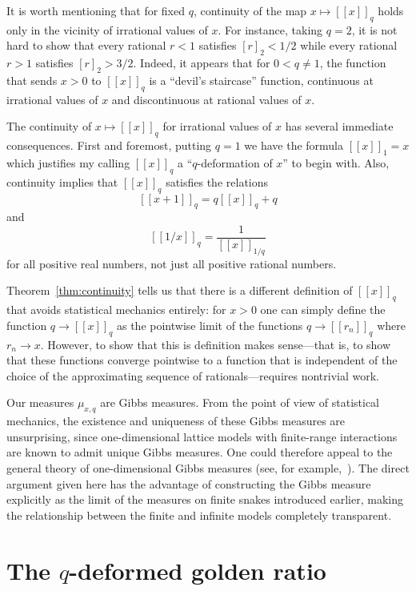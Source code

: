 \documentclass[12pt]{article}
\theoremstyle{plain}
\theoremstyle{definition}
\theoremstyle{remark}
\newcommand{\llb}{[\![}
\newcommand{\rrb}{]\!]}
\begin{document}
It is worth mentioning that for fixed $q$,
continuity of the map $x \mapsto \llb x \rrb_q$
holds only in the vicinity of irrational values of $x$.
For instance, taking $q=2$, it is not hard to show that
every rational $r<1$ satisfies $[r]_2 < 1/2$
while every rational $r>1$ satisfies $[r]_2 > 3/2$.
Indeed, it appears that for $0 < q \neq 1$,
the function that sends $x>0$ to $\llb x \rrb_q$
is a ``devil's staircase'' function,
continuous at irrational values of $x$
and discontinuous at rational values of $x$.

The continuity of $x \mapsto \llb x \rrb_q$ for irrational values of $x$ 
has several immediate consequences. First and foremost,
putting $q=1$ we have the formula $\llb x \rrb_1 = x$ which justifies 
my calling $\llb x \rrb_q$ a ``$q$-deformation of $x$'' to begin with.
Also, continuity implies that 
$\llb x \rrb_q$ satisfies the relations
$$\llb x+1 \rrb_q = q \llb x \rrb_q + q$$ and
$$\llb 1/x \rrb_q = \frac{1}{\llb x \rrb_{1/q}}$$
for all positive real numbers,
not just all positive rational numbers.

Theorem~\ref{thm:continuity} tells us that there is a different definition
of $\llb x \rrb_q$ that avoids statistical mechanics entirely:
for $x>0$ one can simply define the function $q \rightarrow \llb x \rrb_q$
as the pointwise limit of the functions $q \rightarrow \llb r_n \rrb_q$
where $r_n \rightarrow x$.
However, to show that this is definition makes sense---that is,
to show that these functions converge pointwise
to a function that is independent of the
choice of the approximating sequence of rationals---requires
nontrivial work.

Our measures $\mu_{x,q}$ are Gibbs measures.
From the point of view of statistical mechanics, 
the existence and uniqueness of these Gibbs measures are unsurprising, 
since one-dimensional lattice models with finite-range interactions 
are known to admit unique Gibbs measures. 
One could therefore appeal to the general theory 
of one-dimensional Gibbs measures (see, for example,~\cite{G11}). 
The direct argument given here has the advantage 
of constructing the Gibbs measure explicitly as the limit 
of the measures on finite snakes introduced earlier, 
making the relationship between the finite 
and infinite models completely transparent.

\section{The $q$-deformed golden ratio}
\label{sec:golden}
\end{document}
